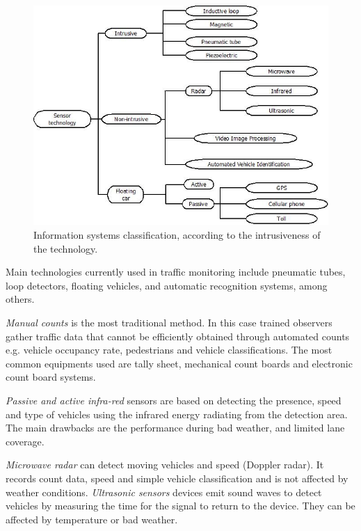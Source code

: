\documentclass[preprint,authoryear,12pt]{elsarticle}
\begin{document}
\begin{figure}[htpb] 
\begin{center} 
\includegraphics[scale=0.55]{intrusivos.jpeg}  %
\end{center} 
\caption{Information systems classification, according to the intrusiveness of the technology.} 
\label{tipossensores} 
\end{figure}

Main technologies currently used in traffic monitoring include pneumatic tubes, loop detectors, floating vehicles, and automatic recognition systems, among others.


\emph{Manual counts} is the most traditional method. In this case trained observers gather traffic data that cannot be efficiently obtained through automated counts e.g. vehicle occupancy rate, pedestrians and vehicle classifications. The most common equipments used are tally sheet, mechanical count boards and electronic count board systems.

\emph{Passive and active infra-red} sensors are based on detecting the presence, speed and type of vehicles using the infrared energy radiating from the detection area. The main drawbacks are the performance during bad weather, and limited lane coverage.

\emph{Microwave radar} can detect moving vehicles and speed (Doppler radar). It records count data, speed and simple vehicle classification and is not affected by weather conditions.
\emph{Ultrasonic sensors} devices emit sound waves to detect vehicles by measuring the time for the signal to return to the device. They can be affected by temperature or bad weather. 
\end{document}
